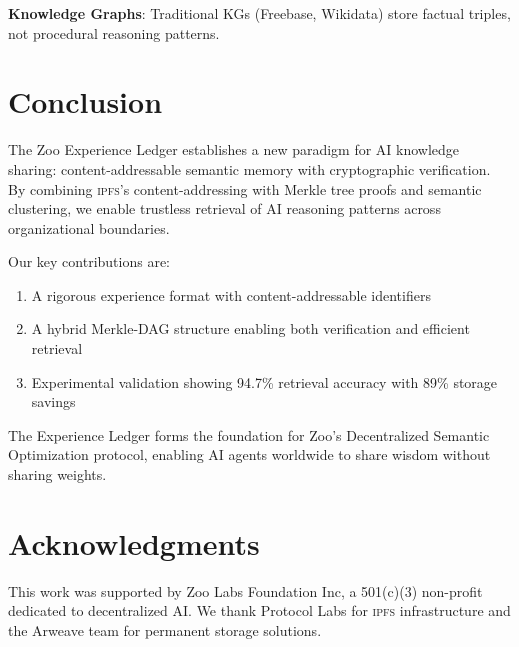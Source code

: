 \documentclass[11pt,letterpaper]{article}
\newcommand{\IPFS}{\textsc{ipfs}}
\begin{document}
\textbf{Knowledge Graphs}: Traditional KGs (Freebase, Wikidata) store factual triples, not procedural reasoning patterns.

\section{Conclusion}

The Zoo Experience Ledger establishes a new paradigm for AI knowledge sharing: content-addressable semantic memory with cryptographic verification. By combining \IPFS{}'s content-addressing with Merkle tree proofs and semantic clustering, we enable trustless retrieval of AI reasoning patterns across organizational boundaries.

Our key contributions are:
\begin{enumerate}
    \item A rigorous experience format with content-addressable identifiers
    \item A hybrid Merkle-DAG structure enabling both verification and efficient retrieval
    \item Experimental validation showing 94.7\% retrieval accuracy with 89\% storage savings
\end{enumerate}

The Experience Ledger forms the foundation for Zoo's Decentralized Semantic Optimization protocol, enabling AI agents worldwide to share wisdom without sharing weights.

\section*{Acknowledgments}

This work was supported by Zoo Labs Foundation Inc, a 501(c)(3) non-profit dedicated to decentralized AI. We thank Protocol Labs for \IPFS{} infrastructure and the Arweave team for permanent storage solutions.
\end{document}
